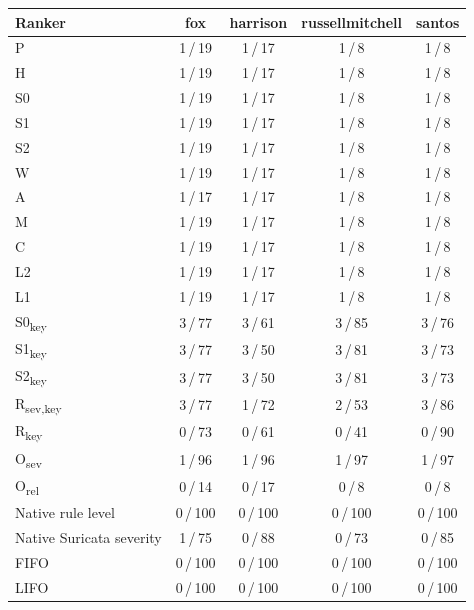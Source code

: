 \begin{tabular}{lcccc}
\toprule
Ranker & fox & harrison & russellmitchell & santos \\
\midrule
P & 1\,/\,19 & 1\,/\,17 & 1\,/\,8 & 1\,/\,8 \\
H & 1\,/\,19 & 1\,/\,17 & 1\,/\,8 & 1\,/\,8 \\
S0 & 1\,/\,19 & 1\,/\,17 & 1\,/\,8 & 1\,/\,8 \\
S1 & 1\,/\,19 & 1\,/\,17 & 1\,/\,8 & 1\,/\,8 \\
S2 & 1\,/\,19 & 1\,/\,17 & 1\,/\,8 & 1\,/\,8 \\
W & 1\,/\,19 & 1\,/\,17 & 1\,/\,8 & 1\,/\,8 \\
A & 1\,/\,17 & 1\,/\,17 & 1\,/\,8 & 1\,/\,8 \\
M & 1\,/\,19 & 1\,/\,17 & 1\,/\,8 & 1\,/\,8 \\
C & 1\,/\,19 & 1\,/\,17 & 1\,/\,8 & 1\,/\,8 \\
L2 & 1\,/\,19 & 1\,/\,17 & 1\,/\,8 & 1\,/\,8 \\
L1 & 1\,/\,19 & 1\,/\,17 & 1\,/\,8 & 1\,/\,8 \\
S0\textsubscript{key} & 3\,/\,77 & 3\,/\,61 & 3\,/\,85 & 3\,/\,76 \\
S1\textsubscript{key} & 3\,/\,77 & 3\,/\,50 & 3\,/\,81 & 3\,/\,73 \\
S2\textsubscript{key} & 3\,/\,77 & 3\,/\,50 & 3\,/\,81 & 3\,/\,73 \\
R\textsubscript{sev,key} & 3\,/\,77 & 1\,/\,72 & 2\,/\,53 & 3\,/\,86 \\
R\textsubscript{key} & 0\,/\,73 & 0\,/\,61 & 0\,/\,41 & 0\,/\,90 \\
O\textsubscript{sev} & 1\,/\,96 & 1\,/\,96 & 1\,/\,97 & 1\,/\,97 \\
O\textsubscript{rel} & 0\,/\,14 & 0\,/\,17 & 0\,/\,8 & 0\,/\,8 \\
Native rule level & 0\,/\,100 & 0\,/\,100 & 0\,/\,100 & 0\,/\,100 \\
Native Suricata severity & 1\,/\,75 & 0\,/\,88 & 0\,/\,73 & 0\,/\,85 \\
FIFO & 0\,/\,100 & 0\,/\,100 & 0\,/\,100 & 0\,/\,100 \\
LIFO & 0\,/\,100 & 0\,/\,100 & 0\,/\,100 & 0\,/\,100 \\
\bottomrule
\end{tabular}
